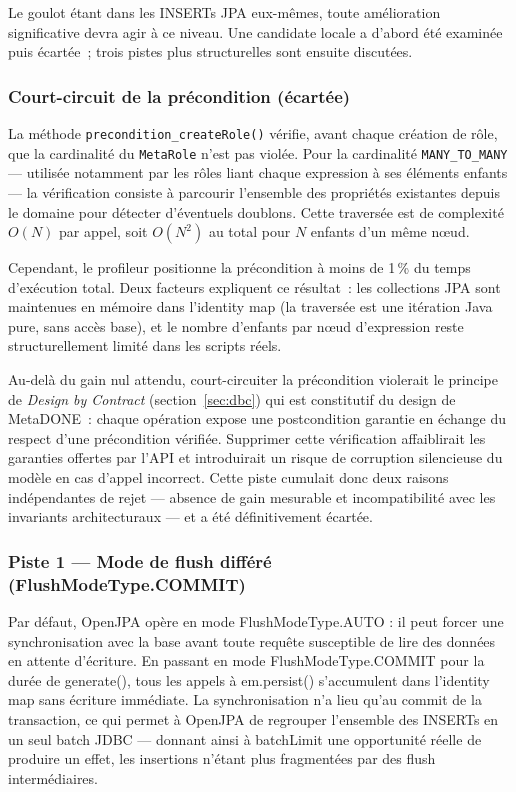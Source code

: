 Le goulot étant dans les INSERTs JPA eux-mêmes, toute amélioration significative devra agir à ce niveau. Une candidate locale a d'abord été examinée puis écartée~; trois pistes plus structurelles sont ensuite discutées.

\subsubsection{Court-circuit de la précondition (écartée)}
\label{sec:scenario2-precondition-rejet}

La méthode \texttt{precondition\_createRole()} vérifie, avant chaque création de rôle, que la cardinalité du \texttt{MetaRole} n'est pas violée. Pour la cardinalité \texttt{MANY\_TO\_MANY} --- utilisée notamment par les rôles liant chaque expression à ses éléments enfants --- la vérification consiste à parcourir l'ensemble des propriétés existantes depuis le domaine pour détecter d'éventuels doublons. Cette traversée est de complexité $O(N)$ par appel, soit $O(N^2)$ au total pour $N$ enfants d'un même nœud.

Cependant, le profileur positionne la précondition à moins de 1\,\% du temps d'exécution total. Deux facteurs expliquent ce résultat~: les collections JPA sont maintenues en mémoire dans l'identity map (la traversée est une itération Java pure, sans accès base), et le nombre d'enfants par nœud d'expression reste structurellement limité dans les scripts réels.

Au-delà du gain nul attendu, court-circuiter la précondition violerait le principe de \emph{Design by Contract} (section~\ref{sec:dbc}) qui est constitutif du design de MetaDONE~: chaque opération expose une postcondition garantie en échange du respect d'une précondition vérifiée. Supprimer cette vérification affaiblirait les garanties offertes par l'API et introduirait un risque de corruption silencieuse du modèle en cas d'appel incorrect. Cette piste cumulait donc deux raisons indépendantes de rejet --- absence de gain mesurable et incompatibilité avec les invariants architecturaux --- et a été définitivement écartée.

\subsubsection{Piste 1 — Mode de flush différé (FlushModeType.COMMIT)}


Par défaut, OpenJPA opère en mode FlushModeType.AUTO : il peut forcer une synchronisation avec la base avant toute requête susceptible de lire des données en attente d'écriture. En passant en mode FlushModeType.COMMIT pour la durée de generate(), tous les appels à em.persist() s'accumulent dans l'identity map sans écriture immédiate. La synchronisation n'a lieu qu'au commit de la transaction, ce qui permet à OpenJPA de regrouper l'ensemble des INSERTs en un seul batch JDBC — donnant ainsi à batchLimit une opportunité réelle de produire un effet, les insertions n'étant plus fragmentées par des flush intermédiaires.

